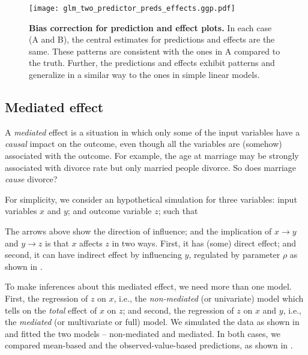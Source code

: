 \begin{figure}
\begin{center}
\texttt{[image: glm\_two\_predictor\_preds\_effects.ggp.pdf]}
\end{center}
\caption{{\bf Bias correction for prediction and effect plots.} In each case (A and B), the central estimates for predictions and effects are the same. These patterns are  consistent with the ones in A compared to the truth. Further, the predictions and effects exhibit patterns and generalize in a similar way to the ones in simple linear models.
}
\label{fig:pred_bin_prediction_effects_plots}
\end{figure}


\subsection{Mediated effect}

A \emph{mediated} effect is a situation in which only some of the input variables have a \emph{causal} impact on the outcome, even though all the variables are (somehow) associated with the outcome. For example, the age at marriage may be strongly associated with divorce rate but only married people divorce. So does marriage \emph{cause} divorce?

For simplicity, we consider an hypothetical simulation for three variables: input variables $x$ and $y$; and outcome variable $z$; such that
%
\begin{center}
\end{center}
%
The arrows above show the direction of influence; and the implication of $x\rightarrow y$ and $y \rightarrow z$ is that $x$ affects $z$ in two ways. First, it has (some) direct effect; and second, it can have indirect effect by influencing $y$, regulated by parameter $\rho$ as shown in .

To make inferences about this mediated effect, we need more than one model. First, the regression of $z$ on $x$, i.e., the \emph{non-mediated} (or univariate) model which tells on the \emph{total} effect of $x$ on $z$; and second, the regression of $z$ on $x$ and $y$, i.e., the \emph{mediated} (or multivariate or full) model. We simulated the data as shown in  and fitted the two models -- non-mediated and mediated. In both cases, we compared mean-based and the observed-value-based predictions, as shown in .

